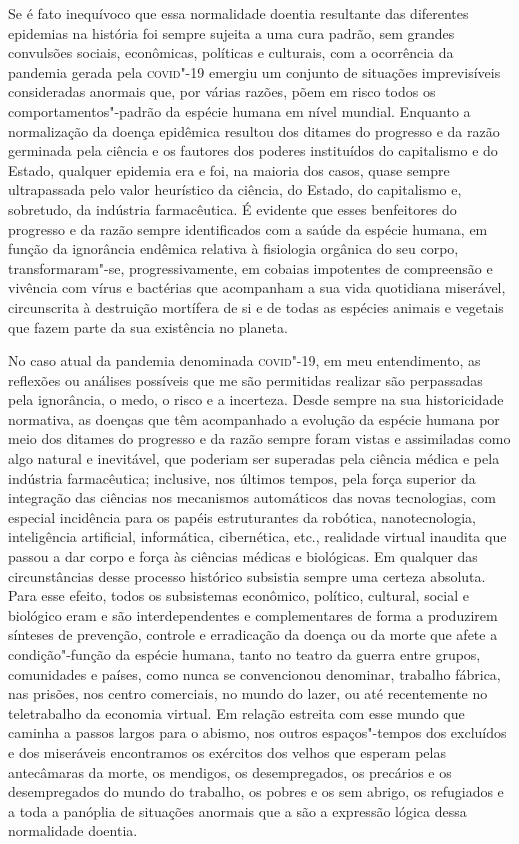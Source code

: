 Se é fato inequívoco que essa normalidade doentia resultante das
diferentes epidemias na história foi sempre sujeita a uma cura padrão,
sem grandes convulsões sociais, econômicas, políticas e culturais, com a
ocorrência da pandemia gerada pela \textsc{covid}"-19 emergiu um conjunto de
situações imprevisíveis consideradas anormais que, por várias razões,
põem em risco todos os comportamentos"-padrão da espécie humana em nível
mundial. Enquanto a normalização da doença epidêmica resultou dos
ditames do progresso e da razão germinada pela ciência e os fautores dos
poderes instituídos do capitalismo e do Estado, qualquer epidemia era e
foi, na maioria dos casos, quase sempre ultrapassada pelo valor
heurístico da ciência, do Estado, do capitalismo e, sobretudo, da
indústria farmacêutica. É evidente que esses benfeitores do progresso e
da razão sempre identificados com a saúde da espécie humana, em função
da ignorância endêmica relativa à fisiologia orgânica do seu corpo,
transformaram"-se, progressivamente, em cobaias impotentes de compreensão
e vivência com vírus e bactérias que acompanham a sua vida quotidiana
miserável, circunscrita à destruição mortífera de si e de todas as
espécies animais e vegetais que fazem parte da sua existência no
planeta.

No caso atual da pandemia denominada \textsc{covid}"-19, em meu entendimento, as
reflexões ou análises possíveis que me são permitidas realizar são
perpassadas pela ignorância, o medo, o risco e a incerteza. Desde sempre
na sua historicidade normativa, as doenças que têm acompanhado a
evolução da espécie humana por meio dos ditames do progresso e da razão
sempre foram vistas e assimiladas como algo natural e inevitável, que
poderiam ser superadas pela ciência médica e pela indústria
farmacêutica; inclusive, nos últimos tempos, pela força superior da
integração das ciências nos mecanismos automáticos das novas
tecnologias, com especial incidência para os papéis estruturantes da
robótica, nanotecnologia, inteligência artificial, informática,
cibernética, etc., realidade virtual inaudita que passou a dar corpo e
força às ciências médicas e biológicas. Em qualquer das circunstâncias
desse processo histórico subsistia sempre uma certeza absoluta. Para
esse efeito, todos os subsistemas econômico, político, cultural, social
e biológico eram e são interdependentes e complementares de forma a
produzirem sínteses de prevenção, controle e erradicação da doença ou da
morte que afete a condição"-função da espécie humana, tanto no teatro da
guerra entre grupos, comunidades e países, como nunca se convencionou
denominar, trabalho fábrica, nas prisões, nos centro comerciais, no
mundo do lazer, ou até recentemente no teletrabalho da economia virtual.
Em relação estreita com esse mundo que caminha a passos largos para o
abismo, nos outros espaços"-tempos dos excluídos e dos miseráveis
encontramos os exércitos dos velhos que esperam pelas antecâmaras da
morte, os mendigos, os desempregados, os precários e os desempregados do
mundo do trabalho, os pobres e os sem abrigo, os refugiados e a toda a
panóplia de situações anormais que a são a expressão lógica dessa
normalidade doentia.

